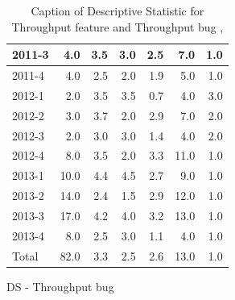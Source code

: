 \documentclass[UKenglish]{ifimaster}  %
\begin{document}
\begin{appendices}
\begin{table}[!htbp]
\begin{adjustwidth}{-2.5cm}{}
\begin{subfigure}[b]{0.3\textwidth}
{\begin{tabular}{ | l | r | r | r | r | r | r | }
2011-3 & 4.0 & 3.5 & 3.0 & 2.5 & 7.0 & 1.0\\ \hline
2011-4 & 4.0 & 2.5 & 2.0 & 1.9 & 5.0 & 1.0\\ \hline
2012-1 & 2.0 & 3.5 & 3.5 & 0.7 & 4.0 & 3.0\\ \hline
2012-2 & 3.0 & 3.7 & 2.0 & 2.9 & 7.0 & 2.0\\ \hline
2012-3 & 2.0 & 3.0 & 3.0 & 1.4 & 4.0 & 2.0\\ \hline
2012-4 & 8.0 & 3.5 & 2.0 & 3.3 & 11.0 & 1.0\\ \hline
2013-1 & 10.0 & 4.4 & 4.5 & 2.7 & 9.0 & 1.0\\ \hline
2013-2 & 14.0 & 2.4 & 1.5 & 2.9 & 12.0 & 1.0\\ \hline
2013-3 & 17.0 & 4.2 & 4.0 & 3.2 & 13.0 & 1.0\\ \hline
2013-4 & 8.0 & 2.5 & 3.0 & 1.1 & 4.0 & 1.0\\ \hline
Total & 82.0 & 3.3 & 2.5 & 2.6 & 13.0 & 1.0\\ \hline
\end{tabular}
}
\caption{DS - Throughput bug}
 \label{DS:TPB:6}
\end{subfigure}
\end{adjustwidth}
\caption[Optional caption for list of figures]{Caption of Descriptive Statistic for Throughput feature and Throughput bug  , }
\label{DS:6:2}
\end{table}




\end{appendices}
\end{document}
